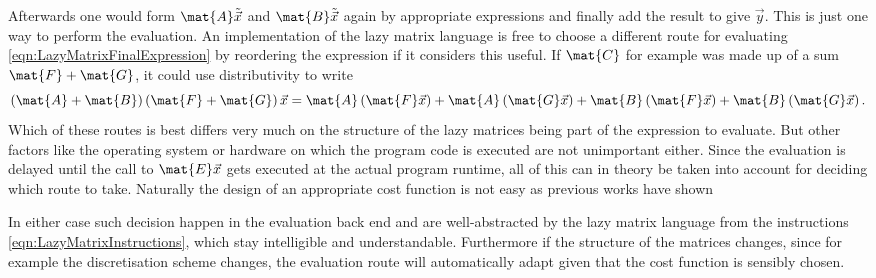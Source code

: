 Afterwards one would form $\mat{A} \tilde{\vec{x}}$ and $\mat{B} \tilde{\vec{x}}$
again by appropriate \contraction expressions
and finally add the result to give $\vec{y}$.
This is just one way to perform the evaluation.
An implementation of the lazy matrix language is free to choose
a different route for evaluating \eqref{eqn:LazyMatrixFinalExpression}
by reordering the expression if it considers this useful.
If $\mat{C}$ for example was made up of a sum $\mat{F} + \mat{G}$,
it could use distributivity to write
\[ \left( \mat{A} + \mat{B} \right) \left( \mat{F} + \mat{G} \right) \vec{x}
	= \mat{A} \left( \mat{F} \vec{x} \right) + \mat{A} \left( \mat{G}\vec{x}\right)
	+ \mat{B} \left( \mat{F} \vec{x} \right) + \mat{B} \left( \mat{G}\vec{x}\right).
\]
Which of these routes is best differs very much on the structure
of the lazy matrices being part of the expression to evaluate.
But other factors like the operating system or hardware on which
the program code is executed are not unimportant either.
Since the evaluation is delayed
until the call to $\mat{E}\vec{x}$ gets executed at the actual program runtime,
all of this can in theory be taken into account for deciding
which route to take.
Naturally the design of an appropriate cost function
is not easy as previous works have shown%
~\cite{Baumgartner2005,Solomonik2014,Peise2015,Calvin2015,Calvin2015arxiv,%
Kristensen2016array,Kristensen2016streaming}

In either case such decision happen in the evaluation back end
and are well-abstracted by the lazy matrix language
from the instructions \eqref{eqn:LazyMatrixInstructions},
which stay intelligible and understandable.
Furthermore if the structure of the matrices changes,
since for example the discretisation scheme changes,
the evaluation route will automatically adapt
given that the cost function is sensibly chosen.

%
%
\defineabbr{LA}{LA\xspace}{Linear algebra}
